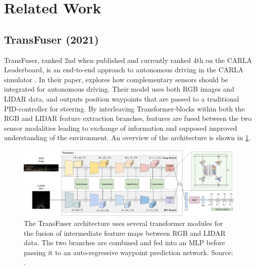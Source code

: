 


\section{Related Work}
\label{sec:related-work}

\subsection{TransFuser (2021)}
TransFuser, ranked 2nd when published and currently ranked 4th on the CARLA Leaderboard,
is an end-to-end approach to autonomous driving in the CARLA simulator
\cite{transfuser-pami, transfuser-cvpr, pwc-carla}.
In their paper, \textcite{transfuser-pami} explores how complementary sensors should be integrated for autonomous driving. Their model uses both RGB images and LIDAR data, and outputs position waypoints that are passed to a traditional PID-controller for steering.
By interleaving Transformer-blocks within both the RGB and LIDAR feature extraction branches,
features are fused between the two sensor modalities leading to exchange of information and supposed improved understanding of the environment. An overview of the architecture is shown in \cref{fig:transfuser-architecture}.

\begin{figure}[htbp]
    \centering
    \includegraphics[width=\textwidth]{figures/2/transfuser-architecture.png}
    \caption{The TransFuser architecture uses several transformer modules for the fusion of intermediate feature maps between RGB and LIDAR data. The two branches are combined and fed into an MLP before passing it to an auto-regressive waypoint prediction network.  Source: \cite{transfuser-pami}.}
    \label{fig:transfuser-architecture}
\end{figure}

